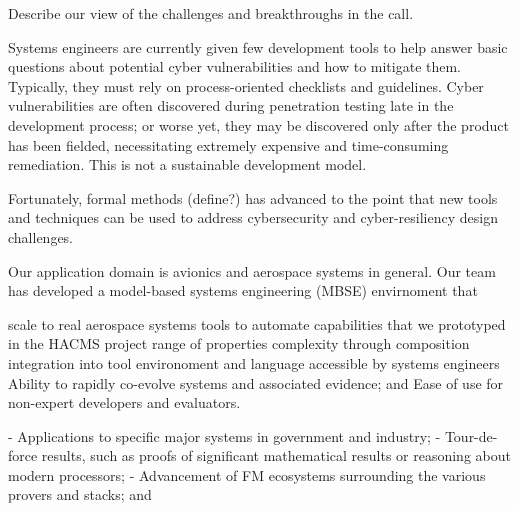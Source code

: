 
Describe our view of the challenges and breakthroughs in the call.

Systems engineers are currently given few
development tools to help answer basic questions about
potential cyber vulnerabilities and how to  mitigate them.  Typically, they must rely on
process-oriented checklists and guidelines. Cyber vulnerabilities
are often discovered during penetration testing late in the
development process; or worse yet, they may be discovered
only after the product has been fielded, necessitating extremely
expensive and time-consuming remediation. This is not a
sustainable development model.

Fortunately, formal methods 
(define?)
has advanced to the point that new tools and techniques can 
be used to address cybersecurity and cyber-resiliency design challenges.  

Our application domain is avionics and aerospace systems in general.  
Our team has developed a model-based systems engineering (MBSE) 
envirnoment that 

scale to real aerospace systems
tools to automate capabilities that we prototyped in the HACMS project \cite{HACMS}
range of properties
complexity through composition
integration into tool environoment and language accessible by systems engineers
Ability to rapidly co-evolve systems and associated evidence; and
Ease of use for non-expert developers and evaluators.

 - Applications to specific major systems in government and industry;
 - Tour-de-force results, such as proofs of significant mathematical results or reasoning about modern processors;
 - Advancement of FM ecosystems surrounding the various provers and stacks; and